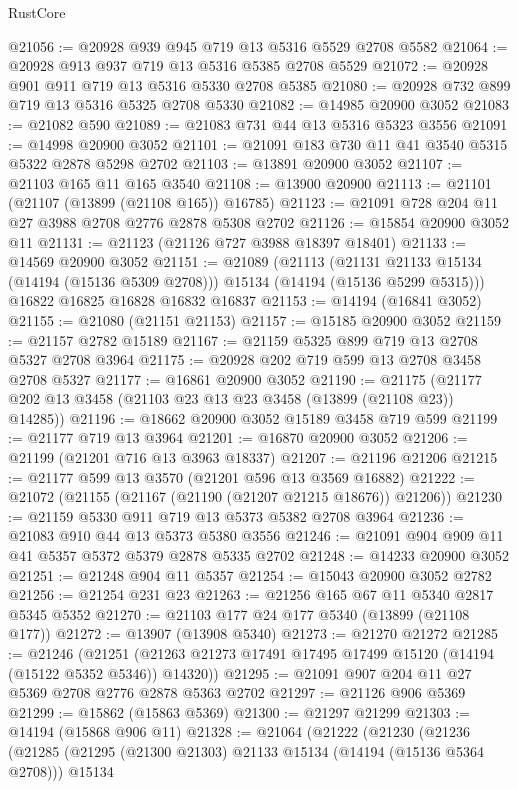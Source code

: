 \begin{lexlean}{RustCore}
\begin{coremodule}
@21056 := @20928 @939 @945 @719 @13 @5316 @5529 @2708 @5582
@21064 := @20928 @913 @937 @719 @13 @5316 @5385 @2708 @5529
@21072 := @20928 @901 @911 @719 @13 @5316 @5330 @2708 @5385
@21080 := @20928 @732 @899 @719 @13 @5316 @5325 @2708 @5330
@21082 := @14985 @20900 @3052
@21083 := @21082 @590
@21089 := @21083 @731 @44 @13 @5316 @5323 @3556
@21091 := @14998 @20900 @3052
@21101 := @21091 @183 @730 @11 @41 @3540 @5315 @5322 @2878 @5298 @2702
@21103 := @13891 @20900 @3052
@21107 := @21103 @165 @11 @165 @3540
@21108 := @13900 @20900
@21113 := @21101 (@21107 (@13899 (@21108 @165)) @16785)
@21123 := @21091 @728 @204 @11 @27 @3988 @2708 @2776 @2878 @5308 @2702
@21126 := @15854 @20900 @3052 @11
@21131 := @21123 (@21126 @727 @3988 @18397 @18401)
@21133 := @14569 @20900 @3052
@21151 := @21089
    (@21113
      (@21131 @21133 @15134 (@14194 (@15136 @5309 @2708)))
      @15134
      (@14194 (@15136 @5299 @5315)))
    @16822
    @16825
    @16828
    @16832
    @16837
@21153 := @14194 (@16841 @3052)
@21155 := @21080 (@21151 @21153)
@21157 := @15185 @20900 @3052
@21159 := @21157 @2782 @15189
@21167 := @21159 @5325 @899 @719 @13 @2708 @5327 @2708 @3964
@21175 := @20928 @202 @719 @599 @13 @2708 @3458 @2708 @5327
@21177 := @16861 @20900 @3052
@21190 := @21175 (@21177 @202 @13 @3458 (@21103 @23 @13 @23 @3458 (@13899 (@21108 @23)) @14285))
@21196 := @18662 @20900 @3052 @15189 @3458 @719 @599
@21199 := @21177 @719 @13 @3964
@21201 := @16870 @20900 @3052
@21206 := @21199 (@21201 @716 @13 @3963 @18337)
@21207 := @21196 @21206
@21215 := @21177 @599 @13 @3570 (@21201 @596 @13 @3569 @16882)
@21222 := @21072 (@21155 (@21167 (@21190 (@21207 @21215 @18676)) @21206))
@21230 := @21159 @5330 @911 @719 @13 @5373 @5382 @2708 @3964
@21236 := @21083 @910 @44 @13 @5373 @5380 @3556
@21246 := @21091 @904 @909 @11 @41 @5357 @5372 @5379 @2878 @5335 @2702
@21248 := @14233 @20900 @3052
@21251 := @21248 @904 @11 @5357
@21254 := @15043 @20900 @3052 @2782
@21256 := @21254 @231 @23
@21263 := @21256 @165 @67 @11 @5340 @2817 @5345 @5352
@21270 := @21103 @177 @24 @177 @5340 (@13899 (@21108 @177))
@21272 := @13907 (@13908 @5340)
@21273 := @21270 @21272
@21285 := @21246
    (@21251 (@21263 @21273 @17491 @17495 @17499 @15120 (@14194 (@15122 @5352 @5346)) @14320))
@21295 := @21091 @907 @204 @11 @27 @5369 @2708 @2776 @2878 @5363 @2702
@21297 := @21126 @906 @5369
@21299 := @15862 (@15863 @5369)
@21300 := @21297 @21299
@21303 := @14194 (@15868 @906 @11)
@21328 := @21064
    (@21222
      (@21230
        (@21236
          (@21285
            (@21295 (@21300 @21303) @21133 @15134 (@14194 (@15136 @5364 @2708)))
            @15134

\end{coremodule}
\end{lexlean}
